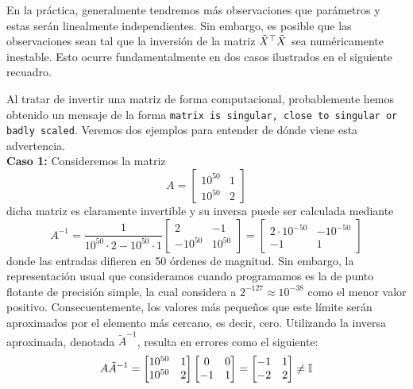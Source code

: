 En la práctica, generalmente tendremos más observaciones que parámetros y estas serán linealmente independientes. Sin embargo, es posible que las observaciones sean tal que la inversión de la matriz  $\tilde{X}^\top\tilde{X}$ sea numéricamente  inestable. Esto ocurre fundamentalmente en dos casos ilustrados en el siguiente recuadro.  

\begin{mdframed}[style=discusion, frametitle={\center Matriz cuasi-singular o incorrectamente escalada}]

Al tratar de invertir una matriz de forma computacional, probablemente hemos obtenido un mensaje de la forma \texttt{matrix is singular, close to singular or badly scaled}. Veremos dos ejemplos para entender de dónde viene esta advertencia. \\

\noindent\textbf{Caso 1:} Consideremos la matriz 
\begin{equation*}
	A = \left[ \begin{matrix}10^{50} & 1 \\  10^{50}  & 2\end{matrix}\right]
\end{equation*}
dicha matriz es claramente invertible y su inversa puede ser calculada mediante
\begin{equation*}
	A^{-1} = \frac{1}{10^{50} \cdot 2 - 10^{50}\cdot 1}\left[ \begin{matrix}2 & -1 \\  -10^{50}  & 10^{50}\end{matrix}\right]
	=\left[ \begin{matrix}2\cdot10^{-50} & -10^{-50} \\  -1  & 1\end{matrix}\right]
\end{equation*}
donde las entradas difieren en 50 órdenes de magnitud. Sin embargo, la representación usual que consideramos cuando programamos es la de punto flotante de precisión simple, la cual considera a $2^{-127}\approx 10^{-38}$ como el menor valor positivo. Consecuentemente, los valores más pequeños que este límite serán aproximados por el elemento más cercano, es decir, cero. Utilizando la inversa aproximada, denotada $\tilde{A}^{-1}$, resulta en errores como el siguiente:
\begin{equation*}
	A\tilde{A}^{-1} = \left[ \begin{matrix}10^{50} & 1 \\  10^{50}  & 2\end{matrix}\right] \left[ \begin{matrix} 0 & 0 \\  -1  & 1\end{matrix}\right] = \left[ \begin{matrix} -1 & 1 \\  -2  & 2\end{matrix}\right] \neq {\mathbb I}
\end{equation*}


\end{mdframed}
